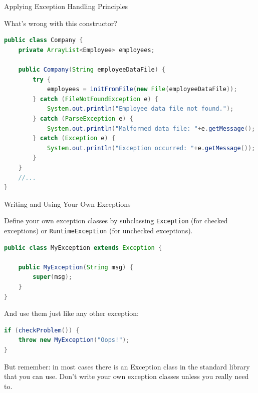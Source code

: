 \documentclass{beamer}
\begin{document}
\begin{frame}[fragile]{Applying Exception Handling Principles}


What's wrong with this constructor?
\begin{lstlisting}[language=Java]
public class Company {
    private ArrayList<Employee> employees;

    public Company(String employeeDataFile) {
        try {
            employees = initFromFile(new File(employeeDataFile));
        } catch (FileNotFoundException e) {
            System.out.println("Employee data file not found.");
        } catch (ParseException e) {
            System.out.println("Malformed data file: "+e.getMessage();
        } catch (Exception e) {
            System.out.println("Exception occurred: "+e.getMessage());
        }
    }
    //...
}
\end{lstlisting}

\end{frame}

\begin{frame}[fragile]{Writing and Using Your Own Exceptions}


Define your own exception classes by subclassing {\tt Exception} (for checked exceptions) or {\tt RuntimeException} (for unchecked exceptions). 

\begin{lstlisting}[language=Java]
public class MyException extends Exception {

    public MyException(String msg) {
        super(msg);
    }
}
\end{lstlisting}
And use them just like any other exception:
\begin{lstlisting}[language=Java]
if (checkProblem()) {
    throw new MyException("Oops!");
}
\end{lstlisting}

But remember: in most cases there is an Exception class in the standard library that you can use. Don't write your own exception classes unless you really need to.

\end{frame}
\end{document}
